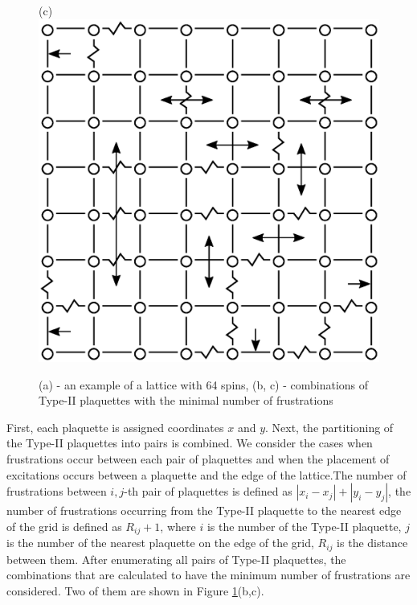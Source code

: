 \documentclass[utf8, babel, sor, jor, amsmath, amssymb, reprint]{elsarticle} %
\begin{document}
\begin{figure}[H]
\begin{minipage}[h]{0.3\linewidth}
	\end{minipage}
	\hspace{10pt}
	\begin{minipage}[h]{0.3\linewidth}
		\centering(c)
		\includegraphics[width=1\linewidth]{pictures/2PS_cell64_J72_5.eps}
	\end{minipage}
	\caption{(a) - an example of a lattice with 64 spins, (b, c) - combinations of Type-II plaquettes with the minimal number of frustrations}
	\label{fig:12PS_cell64_J72_5}
\end{figure}


First, each plaquette is assigned coordinates $x$ and $y$. Next, the partitioning of the Type-II plaquettes into pairs is combined. We consider the cases when frustrations occur between each pair of plaquettes and when the placement of excitations occurs between a plaquette and the edge of the lattice.The number of frustrations between $i,j$-th pair of plaquettes is defined as $\left|x_i-x_j\right|+\left|y_i-y_j\right|$, the number of frustrations occurring from the Type-II plaquette to the nearest edge of the grid is defined as $R_{ij}+1$, where $i$ is the number of the Type-II plaquette, $j$ is the number of the nearest plaquette on the edge of the grid, $R_{ij}$ is the distance between them. After enumerating all pairs of Type-II plaquettes, the combinations that are calculated to have the minimum number of frustrations are considered. Two of them are shown in Figure \ref{fig:12PS_cell64_J72_5}(b,c).
\end{document}
